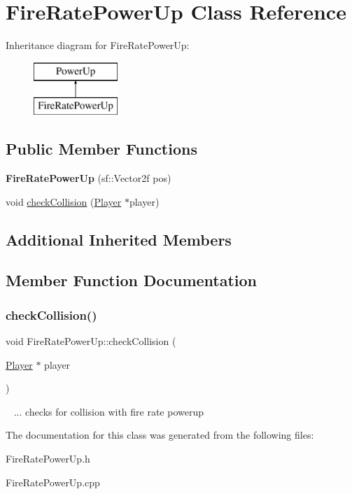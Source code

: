 \hypertarget{class_fire_rate_power_up}{}\section{Fire\+Rate\+Power\+Up Class Reference}
\label{class_fire_rate_power_up}
Inheritance diagram for Fire\+Rate\+Power\+Up\+:\begin{figure}[H]
\begin{center}
\leavevmode
\includegraphics[height=2.000000cm]{class_fire_rate_power_up}
\end{center}
\end{figure}
\subsection*{Public Member Functions}
\begin{DoxyCompactItemize}
\item 
\mbox{\label{class_fire_rate_power_up_a70d9addd3e9d0d7ad3d4a26f0ae65bc9}} 
{\bfseries Fire\+Rate\+Power\+Up} (sf\+::\+Vector2f pos)
\item 
void \mbox{\hyperlink{class_fire_rate_power_up_a728e0416b3523ba8922ac0880887d327}{check\+Collision}} (\mbox{\hyperlink{class_player}{Player}} $\ast$player)
\end{DoxyCompactItemize}
\subsection*{Additional Inherited Members}


\subsection{Member Function Documentation}
\mbox{\label{class_fire_rate_power_up_a728e0416b3523ba8922ac0880887d327}} 
\subsubsection{\texorpdfstring{check\+Collision()}{checkCollision()}}
{\footnotesize\ttfamily void Fire\+Rate\+Power\+Up\+::check\+Collision (\begin{DoxyParamCaption}\item[{\mbox{\hyperlink{class_player}{Player}} $\ast$}]{player }\end{DoxyParamCaption})}

~\newline
... checks for collision with fire rate powerup

The documentation for this class was generated from the following files\+:\begin{DoxyCompactItemize}
\item 
Fire\+Rate\+Power\+Up.\+h\item 
Fire\+Rate\+Power\+Up.\+cpp\end{DoxyCompactItemize}
